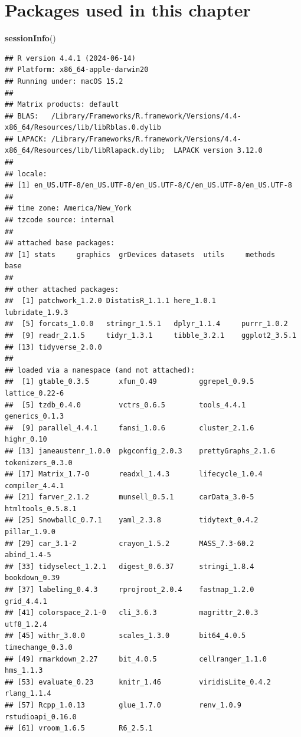 \documentclass[
]{book}
\newenvironment{Shaded}{\begin{snugshade}}{\end{snugshade}}
\newcommand{\FunctionTok}[1]{\textcolor[rgb]{0.13,0.29,0.53}{\textbf{#1}}}
\newcommand{\NormalTok}[1]{#1}
\begin{document}
\section{Packages used in this chapter}\label{packages-used-in-this-chapter-8}

\begin{Shaded}
\begin{Highlighting}[]
\FunctionTok{sessionInfo}\NormalTok{()}
\end{Highlighting}
\end{Shaded}

\begin{verbatim}
## R version 4.4.1 (2024-06-14)
## Platform: x86_64-apple-darwin20
## Running under: macOS 15.2
## 
## Matrix products: default
## BLAS:   /Library/Frameworks/R.framework/Versions/4.4-x86_64/Resources/lib/libRblas.0.dylib 
## LAPACK: /Library/Frameworks/R.framework/Versions/4.4-x86_64/Resources/lib/libRlapack.dylib;  LAPACK version 3.12.0
## 
## locale:
## [1] en_US.UTF-8/en_US.UTF-8/en_US.UTF-8/C/en_US.UTF-8/en_US.UTF-8
## 
## time zone: America/New_York
## tzcode source: internal
## 
## attached base packages:
## [1] stats     graphics  grDevices datasets  utils     methods   base     
## 
## other attached packages:
##  [1] patchwork_1.2.0 DistatisR_1.1.1 here_1.0.1      lubridate_1.9.3
##  [5] forcats_1.0.0   stringr_1.5.1   dplyr_1.1.4     purrr_1.0.2    
##  [9] readr_2.1.5     tidyr_1.3.1     tibble_3.2.1    ggplot2_3.5.1  
## [13] tidyverse_2.0.0
## 
## loaded via a namespace (and not attached):
##  [1] gtable_0.3.5       xfun_0.49          ggrepel_0.9.5      lattice_0.22-6    
##  [5] tzdb_0.4.0         vctrs_0.6.5        tools_4.4.1        generics_0.1.3    
##  [9] parallel_4.4.1     fansi_1.0.6        cluster_2.1.6      highr_0.10        
## [13] janeaustenr_1.0.0  pkgconfig_2.0.3    prettyGraphs_2.1.6 tokenizers_0.3.0  
## [17] Matrix_1.7-0       readxl_1.4.3       lifecycle_1.0.4    compiler_4.4.1    
## [21] farver_2.1.2       munsell_0.5.1      carData_3.0-5      htmltools_0.5.8.1 
## [25] SnowballC_0.7.1    yaml_2.3.8         tidytext_0.4.2     pillar_1.9.0      
## [29] car_3.1-2          crayon_1.5.2       MASS_7.3-60.2      abind_1.4-5       
## [33] tidyselect_1.2.1   digest_0.6.37      stringi_1.8.4      bookdown_0.39     
## [37] labeling_0.4.3     rprojroot_2.0.4    fastmap_1.2.0      grid_4.4.1        
## [41] colorspace_2.1-0   cli_3.6.3          magrittr_2.0.3     utf8_1.2.4        
## [45] withr_3.0.0        scales_1.3.0       bit64_4.0.5        timechange_0.3.0  
## [49] rmarkdown_2.27     bit_4.0.5          cellranger_1.1.0   hms_1.1.3         
## [53] evaluate_0.23      knitr_1.46         viridisLite_0.4.2  rlang_1.1.4       
## [57] Rcpp_1.0.13        glue_1.7.0         renv_1.0.9         rstudioapi_0.16.0 
## [61] vroom_1.6.5        R6_2.5.1
\end{verbatim}
\end{document}

